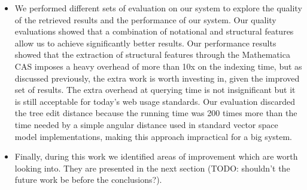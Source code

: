 \begin{itemize}
\item We performed different sets of evaluation on our system to explore the quality of the retrieved results and the performance of our system. Our quality evaluations showed that a combination of notational and structural features allow us to achieve significantly better results. Our performance results showed that the extraction of structural features through the Mathematica CAS imposes a heavy overhead of more than 10x on the indexing time, but as discussed previously, the extra work is worth investing in, given the improved set of results. The extra overhead at querying time is not insignificant but it is still acceptable for today's web usage standards. Our evaluation discarded the tree edit distance because the running time was 200 times more than the time needed by a simple angular distance used in standard vector space model implementations, making this approach impractical for a big system.
\item Finally, during this work we identified areas of improvement which are worth looking into. They are presented in the next section (TODO: shouldn't the future work be before the conclusions?).
\end{itemize}

